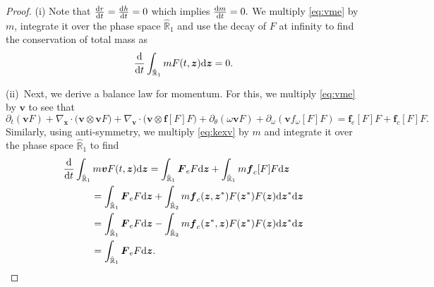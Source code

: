 \documentclass[a4paper,11pt]{article}
\numberwithin{equation}{section}
\theoremstyle{definition}
\newcommand{\bfx}{\boldsymbol{x}}
\newcommand{\bfz}{\boldsymbol{z}}
\newcommand{\bfv}{\boldsymbol{v}}
\newcommand{\bff}{\boldsymbol{f}}
\newcommand{\bfF}{\boldsymbol{F}}
\newcommand{\bbr}{\mathbb R}
\def\d{{  \rm d}}
\begin{document}
\begin{proof} 
%
\noindent (i) Note that $\frac{\d r}{\d t} = \frac{\d h}{\d t} = 0$ which implies $\frac{\d m}{\d t}=0.$ We multiply \eqref{eq:vme} by $m$, integrate it over the phase space $\hat{\bbr}_1$ and use the decay of $F$ at infinity to find the conservation of total mass as
\[ \frac{\d}{\d t} \int_{\hat{\bbr}_1} m F(t,\bfz) \d \bfz = 0. \]

(ii)~Next, we derive a balance law for momentum. For this, we multiply \eqref{eq:vme} by $\bfv$ to see that 
\begin{equation} \label{eq:kexv}
\partial_t (\bfv F) +    \nabla_{\bfx} \cdot \big (\bfv \otimes \bfv F \big)  +  \nabla_{\bfv} \cdot  \Big (  \bfv  \otimes \bff[F] F  \Big ) + \partial_\theta (\omega \bfv F) +  \partial_{\omega} (\bfv f_{\omega}[F] F)=  \bff_e[F] F +  \bff_{c}[F] F.
\end{equation}
%
Similarly, using anti-symmetry, we multiply \eqref{eq:kexv} by $m$ and integrate it over the phase space $\hat{\bbr}_1$ to find 
\begin{align*}
\begin{aligned} 
& \frac{\d}{\d t} \int_{\hat{\bbr}_1} m\bfv F(t,\bfz) \d \bfz 
=  \int_{\hat{\bbr}_1}  \bfF_e F \d\bfz + \int_{\hat{\bbr}_1} m\bff_{c}[F] F \d\bfz \\
&\hspace{1cm}  = \int_{\hat{\bbr}_1}  \bfF_e F \d\bfz  + \int_{\hat{\bbr}_2}  m\bff_c(\bfz, \bfz^*)  F(\bfz^*) F(\bfz)\d\bfz^*\d\bfz \\
&\hspace{1cm}  = \int_{\hat{\bbr}_1}  \bfF_e F \d\bfz  - \int_{\hat{\bbr}_2}  m\bff_c(\bfz^*, \bfz)  F(\bfz^*) F(\bfz)\d\bfz^*\d\bfz \\    
&\hspace{1cm}  =\int_{\hat{\bbr}_1}  \bfF_e F \d\bfz.
\end{aligned}
\end{align*}


\end{proof}
\end{document}
